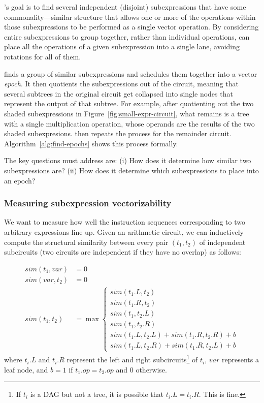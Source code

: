 \system's goal is to find several independent (disjoint) subexpressions that have some commonality---similar structure that allows one or more of the operations within those subexpressions to be performed as a single vector operation. By considering entire subexpressions to group together, rather than individual operations, \system can place all the operations of a given subexpression into a single lane, avoiding rotations for all of them.

\system finds a group of similar subexpressions and schedules them together into a vector {\em epoch}. It then quotients the subexpressions out of the circuit, meaning that several subtrees in the original circuit get collapsed into single nodes that represent the output of that subtree. For example, after quotienting out the two shaded subexpressions in Figure~\ref{fig:small-expr-circuit}, what remains is a tree with a single multiplication operation, whose operands are the results of the two shaded subexpresions. \system then repeats the process for the remainder circuit. Algorithm~\ref{alg:find-epochs} shows this process formally. 

The key questions \system must address are: (i) How does it determine how similar two subexpressions are? (ii) How does it determine which subexpressions to place into an epoch?

\subsubsection*{Measuring subexpression vectorizability}
We want to measure how well the instruction sequences corresponding to two arbitrary expressions line up.
Given an arithmetic circuit, we can inductively compute the structural similarity between every pair $(t_1, t_2)$ of independent subcircuits (two circuits are independent if they have no overlap) as follows: %

\begin{align*}
    sim(t_1, var) &= 0\\
    sim(var, t_2) &= 0\\
    sim(t_1, t_2) &= \max \begin{cases}
        sim(t_1.L, t_2)\\
        sim(t_1.R, t_2)\\
        sim(t_1, t_2.L)\\
        sim(t_1, t_2.R)\\
        sim(t_1.L, t_2.L) + sim(t_1.R, t_2.R) + b\\
        sim(t_1.L, t_2.R) + sim(t_1.R, t_2.L) + b
    \end{cases}
\end{align*}
where $t_i.L$ and $t_i.R$ represent the left and right subcircuits\footnote{If $t_i$ is a DAG but not a tree, it is possible that $t_i.L = t_i.R$. This is fine.} of $t_i$, $var$ represents a leaf node, and $b = 1$ if $t_1.op = t_2.op$ and $0$ otherwise.


